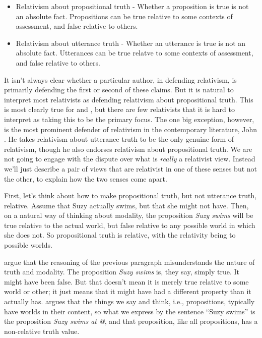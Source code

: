 \begin{itemize}
\item Relativism about propositional truth - Whether a proposition is true is not an absolute fact. Propositions can be true relative to some contexts of assessment, and false relative to others.

\item Relativism about utterance truth - Whether an utterance is true is not an absolute fact. Utterances can be true relatve to some contexts of assessment, and false relative to others.

\end{itemize}
It isn't always clear whether a particular author, in defending relativism, is primarily defending the first or second of these claims. But it is natural to interpret most relativists as defending relativism about propositional truth. This is most clearly true for  \citet{Kolbel2002} and  \citet{Egan2007-EGAEMR}, but there are few relativists that it is hard to interpret as taking this to be the primary focus. The one big exception, however, is the most prominent defender of relativism in the contemporary literature, John  \citet{MacFarlane2014}. He takes relativism about utterance truth to be the only genuine form of relativism, though he also endorses relativism about propositional truth. We are not going to engage with the dispute over what is \emph{really} a relativist view. Instead we'll just describe a pair of views that are relativist in one of these senses but not the other, to explain how the two senses come apart.

First, let's think about how to make propositional truth, but not utterance truth, relative. Assume that Suzy actually swims, but that she might not have. Then, on a natural way of thinking about modality, the proposition \emph{Suzy swims} will be true relative to the actual world, but false relative to any possible world in which she does not. So propositional truth is relative, with the relativity being to possible worlds. 

 \citet{CappelenHawthorne2009} argue that the reasoning of the previous paragraph misunderstands the nature of truth and modality. The proposition \emph{Suzy swims} is, they say, simply true. It might have been false. But that doesn't mean it is merely true relative to some world or other; it just means that it might have had a different property than it actually has.  \citet{Schaffer2012} argues that the things we say and think, i.e., propositions, typically have worlds in their content, so what we express by the sentence ``Suzy swims'' is the proposition \emph{Suzy swims at @}, and that proposition, like all propositions, has a non-relative truth value. 

